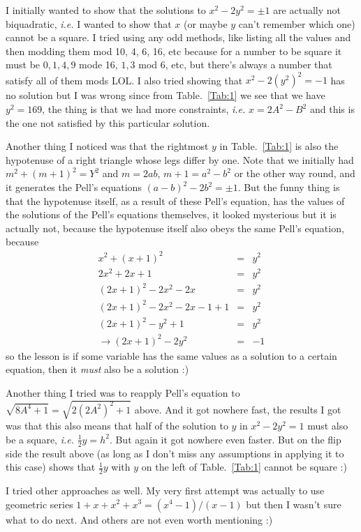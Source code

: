 \documentclass[aps,preprint,preprintnumbers,nofootinbib,showpacs,prd]{revtex4-1}
\newcommand{\ie}{{\it i.e.} }
\newcommand{\nbea}{\begin{eqnarray*}}
\newcommand{\neea}{\end{eqnarray*}}
\begin{document}
I initially wanted to show that the solutions to $x^2 - 2y^2 = \pm1$ are actually not biquadratic, \ie I wanted to show that $x$ (or maybe $y$ can't remember which one) cannot be a square. I tried using any odd methods, like listing all the values and then modding them mod 10, 4, 6, 16, etc because for a number to be square it must be $0,1,4,9$ mode 16, $1,3$ mod 6, etc, but there's always a number that satisfy all of them mods LOL. I also tried showing that $x^2 - 2(y^2)^2 = -1$ has no solution but I was wrong since from Table.~\ref{Tab:1} we see that we have $y^2 = 169$, the thing is that we had more constraints, \ie $x = 2A^2 - B^2$ and this is the one not satisfied by this particular solution.

Another thing I noticed was that the rightmost $y$ in Table.~\ref{Tab:1} is also the hypotenuse of a right triangle whose legs differ by one. Note that we initially had $m^2 + (m+1)^2 = Y^2$ and $m=2ab$, $m+1 = a^2 - b^2$ or the other way round, and it generates the Pell's equations $(a-b)^2 - 2b^2 = \pm1$. But the funny thing is that the hypotenuse itself, as a result of these Pell's equation, has the values of the solutions of the Pell's equations themselves, it looked mysterious but it is actually not, because the hypotenuse itself also obeys the same Pell's equation, because
%
\nbea
x^2 + (x+1)^2 & = & y^2 \\
2x^2 + 2x + 1 & = & y^2 \\
(2x + 1)^2 - 2x^2 - 2x & = & y^2 \\
(2x + 1)^2 - 2x^2 - 2x -1 + 1 & = & y^2 \\
(2x + 1)^2 - y^2 + 1 & = & y^2 \\
\to (2x + 1)^2 - 2y^2 & = & -1
\neea
%
so the lesson is if some variable has the same values as a solution to a certain equation, then it {\it must} also be a solution :)

Another thing I tried was to reapply Pell's equation to $\sqrt{8A^4 + 1} = \sqrt{2(2A^2)^2 + 1}$ above. And it got nowhere fast, the results I got was that this also means that half of the solution to $y$ in $x^2 - 2y^2 = 1$ must also be a square, \ie $\frac{1}{2}y = h^2$. But again it got nowhere even faster. But on the flip side the result above (as long as I don't miss any assumptions in applying it to this case) shows that $\frac{1}{2}y$ with $y$ on the left of Table.~\ref{Tab:1} cannot be square :)

I tried other approaches as well. My very first attempt was actually to use geometric series $1 + x + x^2 + x^3 = (x^4 - 1)/(x - 1)$ but then I wasn't sure what to do next. And others are not even worth mentioning :)
\end{document}
